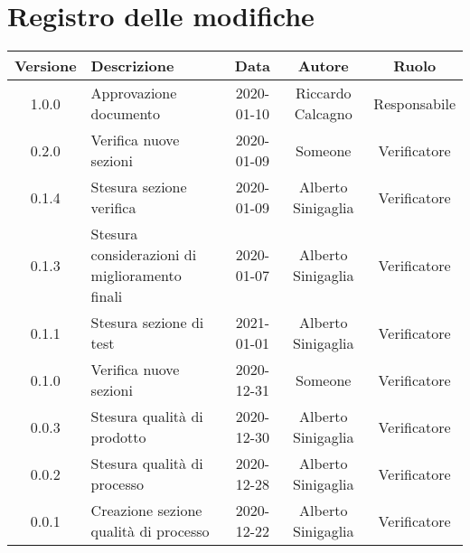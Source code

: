 \section*{Registro delle modifiche}

\begin{center}
	\begin{longtable}{|c|p{5cm}|c|c|c|}
	\hline
	\rowcolor{lighter-grayer}
	\textbf{Versione} & \textbf{Descrizione} & \textbf{Data} & \textbf{Autore} & \textbf{Ruolo} \\
	\hline
	\endfirsthead


	1.0.0 & Approvazione documento & 2020-01-10 & Riccardo Calcagno & Responsabile \\
	\hline
	0.2.0 & Verifica nuove sezioni & 2020-01-09 & Someone & Verificatore \\
	\hline
	0.1.4 & Stesura sezione verifica & 2020-01-09 & Alberto Sinigaglia & Verificatore \\
	\hline
	0.1.3 & Stesura considerazioni di miglioramento finali & 2020-01-07 & Alberto Sinigaglia & Verificatore \\
	\hline
	0.1.1 & Stesura sezione di test & 2021-01-01 & Alberto Sinigaglia & Verificatore \\
	\hline
	0.1.0 & Verifica nuove sezioni & 2020-12-31 & Someone & Verificatore \\
	\hline
	0.0.3 & Stesura qualità di prodotto & 2020-12-30 & Alberto Sinigaglia & Verificatore \\
	\hline
	0.0.2 & Stesura qualità di processo & 2020-12-28 & Alberto Sinigaglia & Verificatore \\
	\hline
	0.0.1 & Creazione sezione qualità di processo & 2020-12-22 & Alberto Sinigaglia & Verificatore \\
	\hline

	\end{longtable}
\end{center}